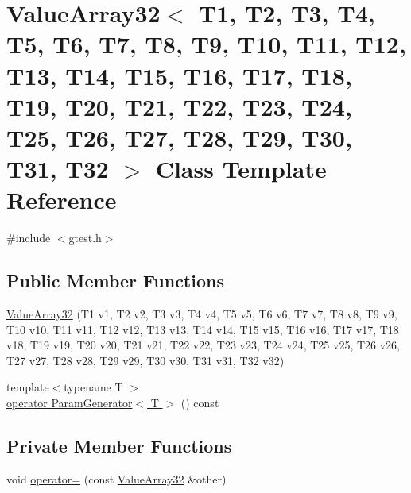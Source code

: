 \hypertarget{classtesting_1_1internal_1_1ValueArray32}{\section{\-Value\-Array32$<$ \-T1, \-T2, \-T3, \-T4, \-T5, \-T6, \-T7, \-T8, \-T9, \-T10, \-T11, \-T12, \-T13, \-T14, \-T15, \-T16, \-T17, \-T18, \-T19, \-T20, \-T21, \-T22, \-T23, \-T24, \-T25, \-T26, \-T27, \-T28, \-T29, \-T30, \-T31, \-T32 $>$ \-Class \-Template \-Reference}
\label{d1/d84/classtesting_1_1internal_1_1ValueArray32}
}


{\ttfamily \#include $<$gtest.\-h$>$}

\subsection*{\-Public \-Member \-Functions}
\begin{DoxyCompactItemize}
\item 
\hyperlink{classtesting_1_1internal_1_1ValueArray32_ac4a3d8912764f941d28508b8c8b7de54}{\-Value\-Array32} (\-T1 v1, \-T2 v2, \-T3 v3, \-T4 v4, \-T5 v5, \-T6 v6, \-T7 v7, \-T8 v8, \-T9 v9, \-T10 v10, \-T11 v11, \-T12 v12, \-T13 v13, \-T14 v14, \-T15 v15, \-T16 v16, \-T17 v17, \-T18 v18, \-T19 v19, \-T20 v20, \-T21 v21, \-T22 v22, \-T23 v23, \-T24 v24, \-T25 v25, \-T26 v26, \-T27 v27, \-T28 v28, \-T29 v29, \-T30 v30, \-T31 v31, \-T32 v32)
\item 
{\footnotesize template$<$typename T $>$ }\\\hyperlink{classtesting_1_1internal_1_1ValueArray32_a08ef46fa12c9dd8ef6fc630baeea89b7}{operator Param\-Generator$<$ T $>$} () const 
\end{DoxyCompactItemize}
\subsection*{\-Private \-Member \-Functions}
\begin{DoxyCompactItemize}
\item 
void \hyperlink{classtesting_1_1internal_1_1ValueArray32_a0f329956611ca90f0f8fd7633cc40301}{operator=} (const \hyperlink{classtesting_1_1internal_1_1ValueArray32}{\-Value\-Array32} \&other)
\end{DoxyCompactItemize}
